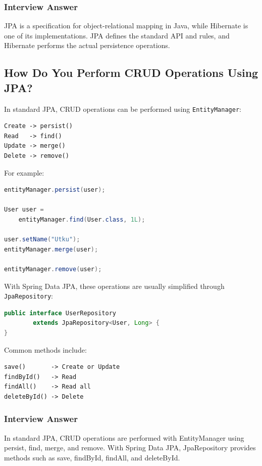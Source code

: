 \documentclass[12pt,a4paper]{article}
\begin{document}
\subsubsection*{Interview Answer}

JPA is a specification for object-relational mapping in Java, while
Hibernate is one of its implementations. JPA defines the standard API and
rules, and Hibernate performs the actual persistence operations.

\subsection{How Do You Perform CRUD Operations Using JPA?}

In standard JPA, CRUD operations can be performed using
\texttt{EntityManager}:

\begin{verbatim}
Create -> persist()
Read   -> find()
Update -> merge()
Delete -> remove()
\end{verbatim}

For example:

\begin{lstlisting}[language=Java]
entityManager.persist(user);

User user =
    entityManager.find(User.class, 1L);

user.setName("Utku");
entityManager.merge(user);

entityManager.remove(user);
\end{lstlisting}

With Spring Data JPA, these operations are usually simplified through
\texttt{JpaRepository}:

\begin{lstlisting}[language=Java]
public interface UserRepository
        extends JpaRepository<User, Long> {
}
\end{lstlisting}

Common methods include:

\begin{verbatim}
save()       -> Create or Update
findById()   -> Read
findAll()    -> Read all
deleteById() -> Delete
\end{verbatim}

\subsubsection*{Interview Answer}

In standard JPA, CRUD operations are performed with EntityManager using
persist, find, merge, and remove. With Spring Data JPA, JpaRepository
provides methods such as save, findById, findAll, and deleteById.
\end{document}
